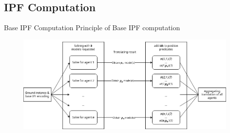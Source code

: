 \subsection{IPF Computation}

\begin{frame}{Base IPF Computation}
    Principle of Base IPF computation
    \begin{figure}[H]
        \centering
        \includegraphics[width=11cm]{img/flowchart_ipf_computation.drawio.png}
    \end{figure}
\end{frame}
